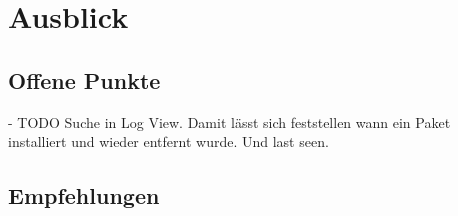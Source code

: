 \chapter{Ausblick}

\section{Offene Punkte}

- TODO Suche in Log View. Damit lässt sich feststellen wann ein Paket installiert und wieder entfernt wurde.
Und last seen.

\section{Empfehlungen}
